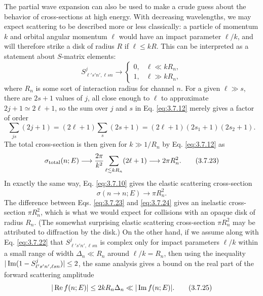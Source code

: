 The partial wave expansion can also be used to make a crude guess about the
behavior of cross-sections at high energy. With decreasing wavelengths, we
may expect scattering to be described more or less classically: a particle of
momentum $k$ and orbital angular momentum $\ell$ would have an impact
parameter $\ell/k$, and will therefore strike a disk of radius $R$ if
$\ell\leq kR$. This can be interpreted as a statement about $S$-matrix
elements:
\begin{equation}
  S^j_{\ell's'n',\ell sn}\longrightarrow
  \begin{cases}
    0,&\ell\ll kR_n,\\
    1,&\ell\gg kR_n,
  \end{cases}
  \tag{3.7.22}\label{eq:3.7.22}
\end{equation}
where $R_n$ is some sort of interaction radius for channel $n$. For a given
$\ell\gg s$, there are $2s+1$ values of $j$, all close enough to $\ell$ to
approximate $2j+1\simeq2\ell+1$, so the sum over $j$ and $s$ in Eq. \eqref{eq:3.7.12}
merely gives a factor of order
\[
  \sum_{js}(2j+1)=(2\ell+1)\sum_s(2s+1)
  =(2\ell+1)(2s_1+1)(2s_2+1).
\]
The total cross-section is then given for $k\gg1/R_n$ by Eq. \eqref{eq:3.7.12} as
\begin{equation}
  \sigma_{\rm total}(n;E)\longrightarrow
  \frac{2\pi}{k^2}\sum_{\ell\lesssim kR_n}(2\ell+1)
  \longrightarrow2\pi R_n^2.
  \tag{3.7.23}\label{eq:3.7.23}
\end{equation}
In exactly the same way, Eq. \eqref{eq:3.7.10} gives the elastic scattering
cross-section
\begin{equation}
  \sigma(n\to n;E)\longrightarrow\pi R_n^2.
  \tag{3.7.24}\label{eq:3.7.24}
\end{equation}
The difference between Eqs. \eqref{eq:3.7.23} and \eqref{eq:3.7.24} gives an inelastic
cross-section $\pi R_n^2$, which is what we would expect for collisions with
an opaque disk of radius $R_n$. (The somewhat surprising elastic scattering
cross-section $\pi R_n^2$ may be attributed to diffraction by the disk.) On
the other hand, if we assume along with Eq. \eqref{eq:3.7.22} that
$S^j_{\ell's'n',\ell sn}$ is complex only for impact parameters $\ell/k$
within a small range of width $\Delta_n\ll R_n$ around $\ell/k=R_n$, then
using the inequality $|\mathop{\rm Im}(1-S^j_{\ell's'n',\ell sn})|\leq2$, the
same analysis gives a bound on the real part of the forward scattering
amplitude
\begin{equation}
  |\mathop{\rm Re}f(n;E)|\leq2kR_n\Delta_n
  \ll|\mathop{\rm Im}f(n;E)|.
  \tag{3.7.25}\label{eq:3.7.25}
\end{equation}
